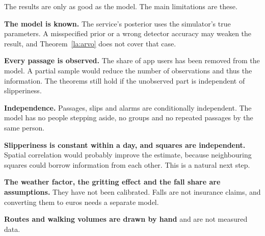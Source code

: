 \documentclass[11pt,a4paper]{article}
\theoremstyle{plain}
\theoremstyle{definition}
\theoremstyle{remark}
\newcommand{\1}{\mathbf{1}}
\begin{document}
The results are only as good as the model. The main limitations are these.

\textbf{The model is known.} The service's posterior uses the simulator's true
parameters. A misspecified prior or a wrong detector accuracy may weaken the
result, and Theorem~\ref{la:arvo} does not cover that case.

\textbf{Every passage is observed.} The share of app users has been removed from
the model. A partial sample would reduce the number of observations and thus
the information. The theorems still hold if the unobserved part is independent
of slipperiness.

\textbf{Independence.} Passages, slips and alarms are conditionally independent.
The model has no people stepping aside, no groups and no repeated passages by the
same person.

\textbf{Slipperiness is constant within a day, and squares are independent.}
Spatial correlation would probably improve the estimate, because neighbouring
squares could borrow information from each other. This is a natural next step.

\textbf{The weather factor, the gritting effect and the fall share are
assumptions.} They have not been calibrated. Falls are not insurance claims, and
converting them to euros needs a separate model.

\textbf{Routes and walking volumes are drawn by hand} and are not measured data.
\end{document}
